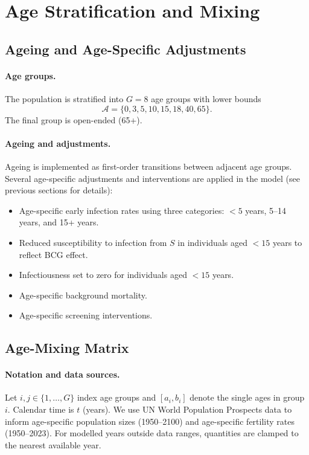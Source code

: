 \documentclass[11pt]{article}
\begin{document}
\section{Age Stratification and Mixing}

\subsection{Ageing and Age-Specific Adjustments}

\paragraph{Age groups.}
The population is stratified into \(G = 8\) age groups with lower bounds
\[
\mathcal{A} = \{0, 3, 5, 10, 15, 18, 40, 65\}.
\]
The final group is open-ended (65+).

\paragraph{Ageing and adjustments.}
Ageing is implemented as first-order transitions between adjacent age groups. Several age-specific adjustments and interventions are applied in the model (see previous sections for details):

\begin{itemize}
\item Age-specific early infection rates using three categories: \(<5\) years, 5--14 years, and 15+ years.
\item Reduced susceptibility to infection from \(S\) in individuals aged \(<15\) years to reflect BCG effect.
\item Infectiousness set to zero for individuals aged \(<15\) years.
\item Age-specific background mortality.
\item Age-specific screening interventions.
\end{itemize}

\subsection{Age-Mixing Matrix}
\label{sec:mixing-matrix}

\paragraph{Notation and data sources.}
Let \(i,j \in \{1,\dots,G\}\) index age groups and \([a_i,b_i]\) denote the single ages in group \(i\). Calendar time is \(t\) (years). 
We use UN World Population Prospects data to inform age-specific population sizes (1950--2100) and age-specific fertility rates (1950--2023). For modelled years outside data ranges, quantities are clamped to the nearest available year.
\end{document}
